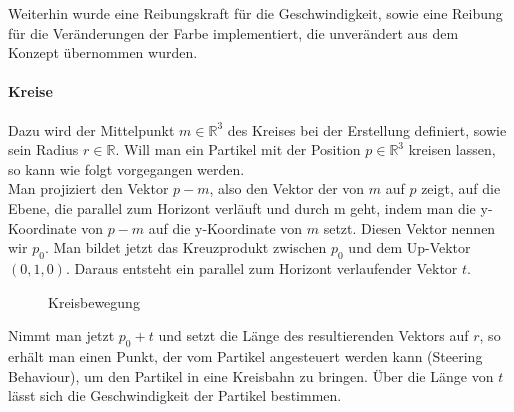 \documentclass[11pt,a4paper]{article}
\begin{document}
\noindent
Weiterhin wurde eine Reibungskraft für die Geschwindigkeit, sowie eine Reibung für die Veränderungen der Farbe implementiert, die unverändert aus dem Konzept übernommen wurden.

\paragraph{Kreise}
Dazu wird der Mittelpunkt $m \in \mathbb{R}^3$ des Kreises bei der Erstellung definiert, sowie sein Radius $r \in \mathbb{R}$.
Will man ein Partikel mit der Position $p \in \mathbb{R}^3$ kreisen lassen, so kann wie folgt vorgegangen werden.\\
Man projiziert den Vektor $p - m$, also den Vektor der von $m$ auf $p$ zeigt, auf die Ebene, die parallel zum Horizont verläuft und durch m geht, indem man die y-Koordinate von $p - m$ auf die y-Koordinate von $m$ setzt. Diesen Vektor nennen wir $p_0$. Man bildet jetzt das Kreuzprodukt zwischen $p_0$ und dem Up-Vektor $(0, 1, 0)$. Daraus entsteht ein parallel zum Horizont verlaufender Vektor $t$.
\begin{center}
\begin{figure}[!ht]
\centering
\vspace{20pt}
\caption[Kreisbewegung]{Kreisbewegung}
\end{figure}
\end{center}
\noindent
Nimmt man jetzt $p_0+t$ und setzt die Länge des resultierenden Vektors auf $r$, so erhält man einen Punkt, der vom Partikel angesteuert werden kann (Steering Behaviour), um den Partikel in eine Kreisbahn zu bringen. Über die Länge von $t$ lässt sich die Geschwindigkeit der Partikel bestimmen.

\newpage
\end{document}
